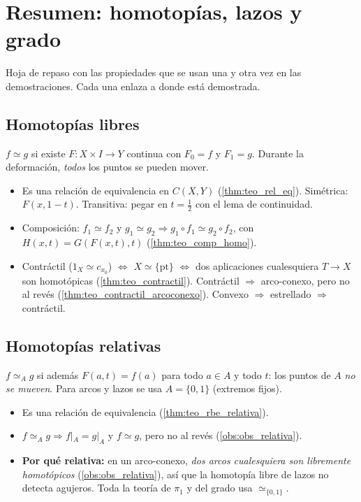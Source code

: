 \section{Resumen: homotopías, lazos y grado}

Hoja de repaso con las propiedades que se usan una y otra vez en las demostraciones. Cada una enlaza a donde está demostrada.

\subsection{Homotopías libres}

$f \simeq g$ si existe $F \colon X \times I \to Y$ continua con $F_0 = f$ y $F_1 = g$. Durante la deformación, \emph{todos} los puntos se pueden mover.
\begin{itemize}
    \item Es una relación de equivalencia en $C(X,Y)$ (\cref{thm:teo_rel_eq}). Simétrica: $F(x,1-t)$. Transitiva: pegar en $t = \frac12$ con el lema de continuidad.
    \item Composición: $f_1 \simeq f_2$ y $g_1 \simeq g_2 \Rightarrow g_1 \circ f_1 \simeq g_2 \circ f_2$, con $H(x,t) = G(F(x,t),t)$ (\cref{thm:teo_comp_homo}).
    \item Contráctil ($1_X \simeq c_{x_0}$) $\iff$ $X \simeq \{\text{pt}\}$ $\iff$ dos aplicaciones cualesquiera $T \to X$ son homotópicas (\cref{thm:teo_contractil}). Contráctil $\Rightarrow$ arco-conexo, pero no al revés (\cref{thm:teo_contractil_arcoconexo}). Convexo $\Rightarrow$ estrellado $\Rightarrow$ contráctil.
\end{itemize}

\subsection{Homotopías relativas}

$f \simeq_A g$ si además $F(a,t) = f(a)$ para todo $a \in A$ y todo $t$: los puntos de $A$ \emph{no se mueven}. Para arcos y lazos se usa $A = \{0,1\}$ (extremos fijos).
\begin{itemize}
    \item Es una relación de equivalencia (\cref{thm:teo_rbe_relativa}).
    \item $f \simeq_A g \Rightarrow f|_A = g|_A$ y $f \simeq g$, pero no al revés (\cref{obs:obs_relativa}).
    \item \textbf{Por qué relativa:} en un arco-conexo, \emph{dos arcos cualesquiera son libremente homotópicos} (\cref{obs:obs_relativa}), así que la homotopía libre de lazos no detecta agujeros. Toda la teoría de $\pi_1$ y del grado usa $\simeq_{\{0,1\}}$.
\end{itemize}

